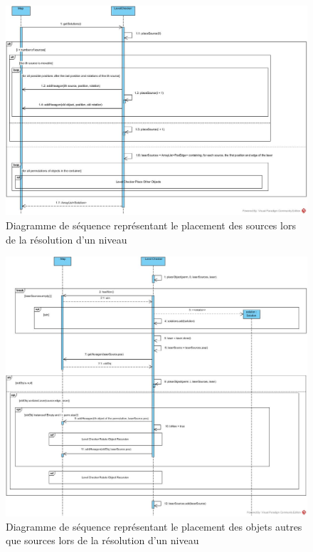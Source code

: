 \documentclass[]{article}
\begin{document}
\begin{figure}[H]
\begin{center}
  \includegraphics[width=\textwidth]{Sequence2.jpg}
  \caption{Diagramme de séquence représentant le placement des sources lors de la résolution d'un niveau}\label{fig:auto}
\end{center}
\end{figure}

\begin{figure}[H]
\begin{center}
  \includegraphics[width=\textwidth]{Sequence3.jpg}
  \caption{Diagramme de séquence représentant le placement des objets autres que sources lors de la résolution d'un niveau}\label{fig:auto}
\end{center}
\end{figure}
\end{document}
